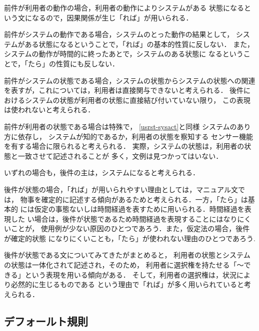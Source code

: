 \begin{enumerate}
前件が利用者の動作の場合，利用者の動作によりシステムがある
状態になるという文になるので，因果関係が生じ「れば」が用いられる．

前件がシステムの動作である場合，システムのとった動作の結果として，
システムがある状態になるということで，「れば」の基本的性質に反しない．
また，システムの動作が時間的に終ったあとで，システムのある状態に
なるということで，「たら」の性質にも反しない．

前件がシステムの状態である場合，システムの状態からシステムの状態への関連を表すが，これについては，利用者は直接関与できないと考えられる．
後件におけるシステムの状態が利用者の状態に直接結び付いていない限り，
この表現は使われないと考えられる．

前件が利用者の状態である場合は特殊で，
\ref{usrst-sysact}と同様
システムのあり方に依存し，
システムが知的であるか，利用者の状態を察知する
センサー機能を有する場合に限られると考えられる．
実際，システムの状態は，利用者の状態と一致させて記述されることが
多く，文例は見つかってはいない．
\end{enumerate}
いずれの場合も，後件の{\dg 主}は，システムになると考えられる．

後件が状態の場合，「れば」が用いられやすい理由としては，マニュアル文では，
物事を確定的に記述する傾向があるためと考えられる．一方，「たら」は基本的
には仮定の事態ないしは時間経過を表すために用いられる．時間経過を表現した
い場合は，後件が状態であるため時間経過を表現することにはなりにくいことが，
使用例が少ない原因のひとつであろう．また，仮定法の場合，後件が確定的状態
になりにくいことも，「たら」が使われない理由のひとつであろう.

後件が状態である文についてみてきたがまとめると，
利用者の状態とシステムの状態は一体化されて記述され，そのため，
利用者に選択権を持たせる「〜できる」という表現を用いる傾向がある．
そして，利用者の選択権は，状況により必然的に生じるものである
という理由で「れば」が多く用いられていると考えられる．

\subsection{デフォールト規則}

